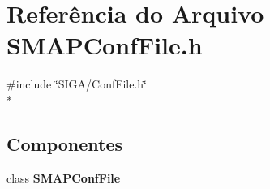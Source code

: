 \section{Referência do Arquivo S\+M\+A\+P\+Conf\+File.\+h}
\label{_s_m_a_p_conf_file_8h}
{\ttfamily \#include \char`\"{}S\+I\+G\+A/\+Conf\+File.\+h\char`\"{}}\\*
\subsection*{Componentes}
\begin{DoxyCompactItemize}
\item 
class {\bf S\+M\+A\+P\+Conf\+File}
\end{DoxyCompactItemize}
